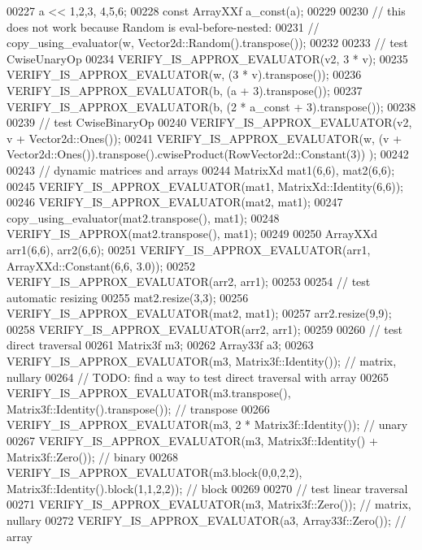 \begin{DoxyCode}
00227     a << 1,2,3, 4,5,6;
00228     \textcolor{keyword}{const} ArrayXXf a\_const(a);
00229     
00230     \textcolor{comment}{// this does not work because Random is eval-before-nested: }
00231     \textcolor{comment}{// copy\_using\_evaluator(w, Vector2d::Random().transpose());}
00232 
00233     \textcolor{comment}{// test CwiseUnaryOp}
00234     VERIFY\_IS\_APPROX\_EVALUATOR(v2, 3 * v);
00235     VERIFY\_IS\_APPROX\_EVALUATOR(w, (3 * v).transpose());
00236     VERIFY\_IS\_APPROX\_EVALUATOR(b, (a + 3).transpose());
00237     VERIFY\_IS\_APPROX\_EVALUATOR(b, (2 * a\_const + 3).transpose());
00238 
00239     \textcolor{comment}{// test CwiseBinaryOp}
00240     VERIFY\_IS\_APPROX\_EVALUATOR(v2, v + Vector2d::Ones());
00241     VERIFY\_IS\_APPROX\_EVALUATOR(w, (v + Vector2d::Ones()).transpose().cwiseProduct(RowVector2d::Constant(3))
      );
00242 
00243     \textcolor{comment}{// dynamic matrices and arrays}
00244     MatrixXd mat1(6,6), mat2(6,6);
00245     VERIFY\_IS\_APPROX\_EVALUATOR(mat1, MatrixXd::Identity(6,6));
00246     VERIFY\_IS\_APPROX\_EVALUATOR(mat2, mat1);
00247     copy\_using\_evaluator(mat2.transpose(), mat1);
00248     VERIFY\_IS\_APPROX(mat2.transpose(), mat1);
00249 
00250     ArrayXXd arr1(6,6), arr2(6,6);
00251     VERIFY\_IS\_APPROX\_EVALUATOR(arr1, ArrayXXd::Constant(6,6, 3.0));
00252     VERIFY\_IS\_APPROX\_EVALUATOR(arr2, arr1);
00253     
00254     \textcolor{comment}{// test automatic resizing}
00255     mat2.resize(3,3);
00256     VERIFY\_IS\_APPROX\_EVALUATOR(mat2, mat1);
00257     arr2.resize(9,9);
00258     VERIFY\_IS\_APPROX\_EVALUATOR(arr2, arr1);
00259 
00260     \textcolor{comment}{// test direct traversal}
00261     Matrix3f m3;
00262     Array33f a3;
00263     VERIFY\_IS\_APPROX\_EVALUATOR(m3, Matrix3f::Identity());  \textcolor{comment}{// matrix, nullary}
00264     \textcolor{comment}{// TODO: find a way to test direct traversal with array}
00265     VERIFY\_IS\_APPROX\_EVALUATOR(m3.transpose(), Matrix3f::Identity().transpose());  \textcolor{comment}{// transpose}
00266     VERIFY\_IS\_APPROX\_EVALUATOR(m3, 2 * Matrix3f::Identity());  \textcolor{comment}{// unary}
00267     VERIFY\_IS\_APPROX\_EVALUATOR(m3, Matrix3f::Identity() + Matrix3f::Zero());  \textcolor{comment}{// binary}
00268     VERIFY\_IS\_APPROX\_EVALUATOR(m3.block(0,0,2,2), Matrix3f::Identity().block(1,1,2,2));  \textcolor{comment}{// block}
00269 
00270     \textcolor{comment}{// test linear traversal}
00271     VERIFY\_IS\_APPROX\_EVALUATOR(m3, Matrix3f::Zero());  \textcolor{comment}{// matrix, nullary}
00272     VERIFY\_IS\_APPROX\_EVALUATOR(a3, Array33f::Zero());  \textcolor{comment}{// array}

\end{DoxyCode}
